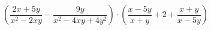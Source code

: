 \begin{ex}[type=expression]
	\begin{condition}
		\( \left( \dfrac{2x+5y}{x^2-2xy}-\dfrac{9y}{x^2-4xy+4y^2} \right)\cdot\left( \dfrac{x-5y}{x+y}+2+\dfrac{x+y}{x-5y} \right) \)
	\end{condition}
\end{ex}